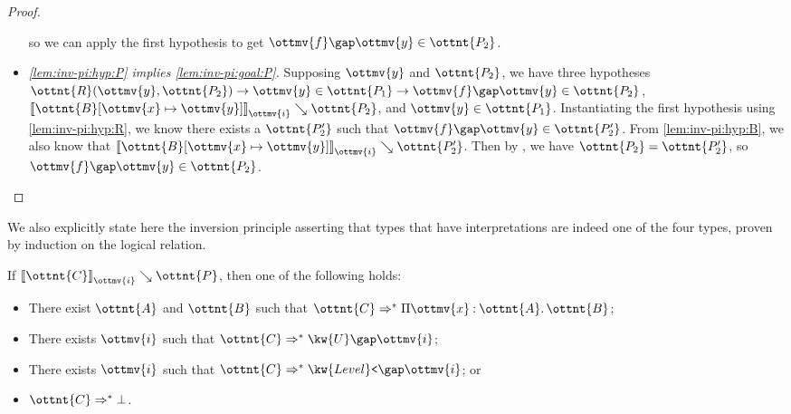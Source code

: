\documentclass[a4paper,UKenglish,cleveref,autoref,thm-restate]{lipics-v2021}
\begin{document}
\begin{proof}
\begin{itemize}
      so we can apply the first hypothesis to get $  \ottmv{f}  \gap  \ottmv{y}   \in  \ottnt{P_{{\mathrm{2}}}} $.
    \item \textit{\ref{lem:inv-pi:hyp:P} implies \ref{lem:inv-pi:goal:P}.}
      Supposing $\ottmv{y}$ and $\ottnt{P_{{\mathrm{2}}}}$,
      we have three hypotheses $   \ottnt{R} ( \ottmv{y} ,  \ottnt{P_{{\mathrm{2}}}} )   \to   \ottmv{y}  \in  \ottnt{P_{{\mathrm{1}}}}    \to    \ottmv{f}  \gap  \ottmv{y}   \in  \ottnt{P_{{\mathrm{2}}}}  $,
      $ \mathopen{\llbracket}   \ottnt{B} [  \ottmv{x}  \mapsto  \ottmv{y}  ]   \mathclose{\rrbracket}_{ \ottmv{i} } \searrow  \ottnt{P_{{\mathrm{2}}}} $, and $ \ottmv{y}  \in  \ottnt{P_{{\mathrm{1}}}} $.
      Instantiating the first hypothesis using \ref{lem:inv-pi:hyp:R},
      we know there exists a $\ottnt{P'_{{\mathrm{2}}}}$ such that $  \ottmv{f}  \gap  \ottmv{y}   \in  \ottnt{P'_{{\mathrm{2}}}} $.
      From \ref{lem:inv-pi:hyp:B}, we also know that $ \mathopen{\llbracket}   \ottnt{B} [  \ottmv{x}  \mapsto  \ottmv{y}  ]   \mathclose{\rrbracket}_{ \ottmv{i} } \searrow  \ottnt{P'_{{\mathrm{2}}}} $.
      Then by , we have $\ottnt{P_{{\mathrm{2}}}} = \ottnt{P'_{{\mathrm{2}}}}$, so $  \ottmv{f}  \gap  \ottmv{y}   \in  \ottnt{P_{{\mathrm{2}}}} $.
      \qedhere
  \end{itemize}
\end{proof}

We also explicitly state here the inversion principle
asserting that types that have interpretations are indeed one of the four types,
proven by induction on the logical relation.

\begin{lemma}[Inversion (l.r.)] \label{lem:lr:inv}
  If $ \mathopen{\llbracket}  \ottnt{C}  \mathclose{\rrbracket}_{ \ottmv{i} } \searrow  \ottnt{P} $, then one of the following holds:
  \begin{itemize}
    \item There exist $\ottnt{A}$ and $\ottnt{B}$ such that $ \ottnt{C}  \Rightarrow^\ast   \Pi  \ottmv{x}  \mathbin{:}  \ottnt{A}  \mathpunct{.}  \ottnt{B}  $;
    \item There exists $\ottmv{i}$ such that $ \ottnt{C}  \Rightarrow^\ast   \kw{U} \gap   \ottmv{i}   $;
    \item There exists $\ottmv{i}$ such that $ \ottnt{C}  \Rightarrow^\ast   \kw{Level}\texttt{<} \gap   \ottmv{i}   $; or
    \item $ \ottnt{C}  \Rightarrow^\ast   \bot  $.
  \end{itemize}
\end{lemma}
\end{document}
